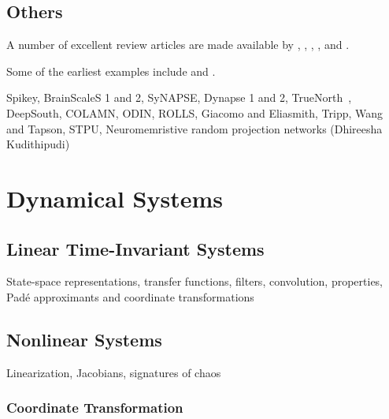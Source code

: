 \subsection{Others}
\label{sec:neuromorphic-others}

A number of excellent review articles are made available by \citet{bartolozzi1999neuromorphic}, \citet{indiveri2011neuromorphic}, \citet{cassidy2013design}, \citet{eryilmaz2016neuromorphic}, and \citet{cummings2018}.

Some of the earliest examples include \citep{sivilotti1985novel, boahen1989heteroassociative} and \citep{mead1988silicon}.

Spikey, BrainScaleS 1 and 2, SyNAPSE, Dynapse 1 and 2, TrueNorth~\citep{merolla2014million, fischl2018}, DeepSouth, COLAMN, ODIN, ROLLS, Giacomo and Eliasmith, Tripp, Wang and Tapson, STPU, Neuromemristive random projection networks (Dhireesha Kudithipudi)

\section{Dynamical Systems}

\subsection{Linear Time-Invariant Systems}

State-space representations, transfer functions, filters, convolution, properties, Pad\'e approximants and coordinate transformations

\subsection{Nonlinear Systems}

Linearization, Jacobians, signatures of chaos

\subsubsection{Coordinate Transformation}

